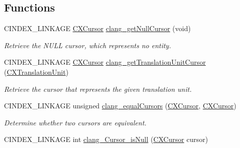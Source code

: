 \subsection*{Functions}
\begin{DoxyCompactItemize}
\item 
\mbox{\label{group__CINDEX__CURSOR__MANIP_ga94d81bbf40dff4ac843458d018f3138e}} 
C\+I\+N\+D\+E\+X\+\_\+\+L\+I\+N\+K\+A\+GE \mbox{\hyperlink{structCXCursor}{C\+X\+Cursor}} \mbox{\hyperlink{group__CINDEX__CURSOR__MANIP_ga94d81bbf40dff4ac843458d018f3138e}{clang\+\_\+get\+Null\+Cursor}} (void)
\begin{DoxyCompactList}\small\item\em Retrieve the N\+U\+LL cursor, which represents no entity. \end{DoxyCompactList}\item 
C\+I\+N\+D\+E\+X\+\_\+\+L\+I\+N\+K\+A\+GE \mbox{\hyperlink{structCXCursor}{C\+X\+Cursor}} \mbox{\hyperlink{group__CINDEX__CURSOR__MANIP_gaec6e69127920785e74e4a517423f4391}{clang\+\_\+get\+Translation\+Unit\+Cursor}} (\mbox{\hyperlink{group__CINDEX_gacdb7815736ca709ce9a5e1ec2b7e16ac}{C\+X\+Translation\+Unit}})
\begin{DoxyCompactList}\small\item\em Retrieve the cursor that represents the given translation unit. \end{DoxyCompactList}\item 
\mbox{\label{group__CINDEX__CURSOR__MANIP_ga98df58f09878710b983b6f3f60f0cba3}} 
C\+I\+N\+D\+E\+X\+\_\+\+L\+I\+N\+K\+A\+GE unsigned \mbox{\hyperlink{group__CINDEX__CURSOR__MANIP_ga98df58f09878710b983b6f3f60f0cba3}{clang\+\_\+equal\+Cursors}} (\mbox{\hyperlink{structCXCursor}{C\+X\+Cursor}}, \mbox{\hyperlink{structCXCursor}{C\+X\+Cursor}})
\begin{DoxyCompactList}\small\item\em Determine whether two cursors are equivalent. \end{DoxyCompactList}\item 
\mbox{\label{group__CINDEX__CURSOR__MANIP_ga91f2a167caa704ee921e94e9397b99d9}} 
C\+I\+N\+D\+E\+X\+\_\+\+L\+I\+N\+K\+A\+GE int \mbox{\hyperlink{group__CINDEX__CURSOR__MANIP_ga91f2a167caa704ee921e94e9397b99d9}{clang\+\_\+\+Cursor\+\_\+is\+Null}} (\mbox{\hyperlink{structCXCursor}{C\+X\+Cursor}} cursor)

\end{DoxyCompactItemize}
